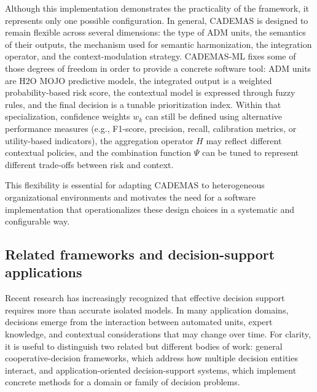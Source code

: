 \documentclass[journal,article,submit,pdftex,moreauthors,mathematics]{Definitions/mdpi}
\begin{document}
Although this implementation demonstrates the practicality of the framework, it represents only one possible configuration. In general, CADEMAS is designed to remain flexible across several dimensions: the type of ADM units, the semantics of their outputs, the mechanism used for semantic harmonization, the integration operator, and the context-modulation strategy. CADEMAS-ML fixes some of those degrees of freedom in order to provide a concrete software tool: ADM units are H2O \citep{H2O.ai2026} MOJO predictive models, the integrated output is a weighted probability-based risk score, the contextual model is expressed through fuzzy rules, and the final decision is a tunable prioritization index. Within that specialization, confidence weights $w_k$ can still be defined using alternative performance measures (e.g., F1-score, precision, recall, calibration metrics, or utility-based indicators), the aggregation operator $H$ may reflect different contextual policies, and the combination function $\Psi$ can be tuned to represent different trade-offs between risk and context.

This flexibility is essential for adapting CADEMAS to heterogeneous organizational environments and motivates the need for a software implementation that operationalizes these design choices in a systematic and configurable way.

\subsection{Related frameworks and decision-support applications}\label{sec:related}

Recent research has increasingly recognized that effective decision support requires more than accurate isolated models. In many application domains, decisions emerge from the interaction between automated units, expert knowledge, and contextual considerations that may change over time. For clarity, it is useful to distinguish two related but different bodies of work: general cooperative-decision frameworks, which address how multiple decision entities interact, and application-oriented decision-support systems, which implement concrete methods for a domain or family of decision problems.
\end{document}
